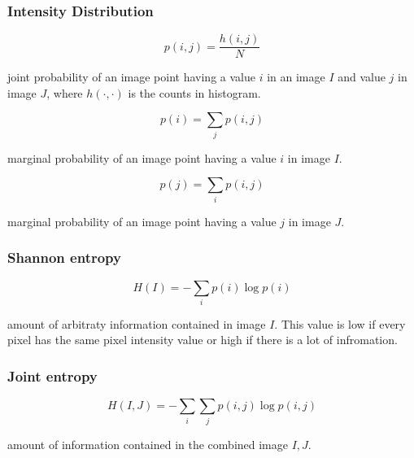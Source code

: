\documentclass[11pt]{article}
\begin{document}
\subsubsection{Intensity Distribution}

\begin{figure}[H]
    \centering
\end{figure}

\begin{equation}
    p(i,j)=\frac {h(i,j)} N
\end{equation}

joint probability of an image point having a value $i$ in an image $I$  and value $j$ in image $J$, where $h(\cdot, \cdot)$ is the counts in histogram.

\begin{equation}
    p(i) = \sum_j p(i,j)
\end{equation}

marginal probability of an image point having a value $i$ in image $I$.

\begin{equation}
    p(j) = \sum_i p(i,j)
\end{equation}

marginal probability of an image point having a value $j$ in image $J$.

\subsubsection{Shannon entropy}

\begin{equation}
    H(I) = - \sum_i p(i)\log p(i)
\end{equation}

amount of arbitraty information contained in image $I$. This value is low if every pixel has the same pixel intensity value or high if there is a lot of infromation.

\subsubsection{Joint entropy}

\begin{equation}
    H(I,J) = - \sum_i \sum_j p(i,j)\log p(i,j)
\end{equation}

amount of information contained in the combined image $I,J$.
\end{document}
